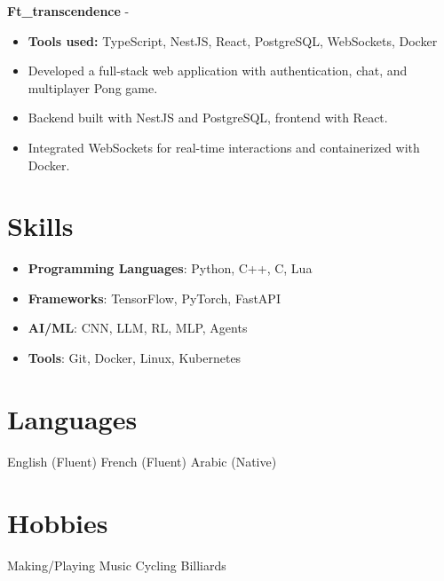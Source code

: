 \documentclass[a4paper,11pt]{article}%
\begin{document}
%
\noindent \textbf{Ft\_transcendence} - \href{https://github.com/sboof911/ft_transcendence}{{}}%
\begin{itemize}[leftmargin=2em,label={},parsep=0pt,topsep=1em]%
\item \textbf{Tools used:} TypeScript, NestJS, React, PostgreSQL, WebSockets, Docker%
\item Developed a full-stack web application with authentication, chat, and multiplayer Pong game.%
\item Backend built with NestJS and PostgreSQL, frontend with React.%
\item Integrated WebSockets for real-time interactions and containerized with Docker.%
\end{itemize}%
\section*{Skills}%
\begin{itemize}[leftmargin=*]%
\item \textbf{Programming Languages}: Python, C++, C, Lua%
\item \textbf{Frameworks}: TensorFlow, PyTorch, FastAPI%
\item \textbf{AI/ML}: CNN, LLM, RL, MLP, Agents%
\item \textbf{Tools}: Git, Docker, Linux, Kubernetes%
\end{itemize}%
\section*{Languages}%
English (Fluent)%
\newline%
%
French (Fluent)%
\newline%
%
Arabic (Native)%
\newline%
%
\section*{Hobbies}%
Making/Playing Music%
\newline%
%
Cycling%
\newline%
%
Billiards%
\newline%
%
\end{document}
